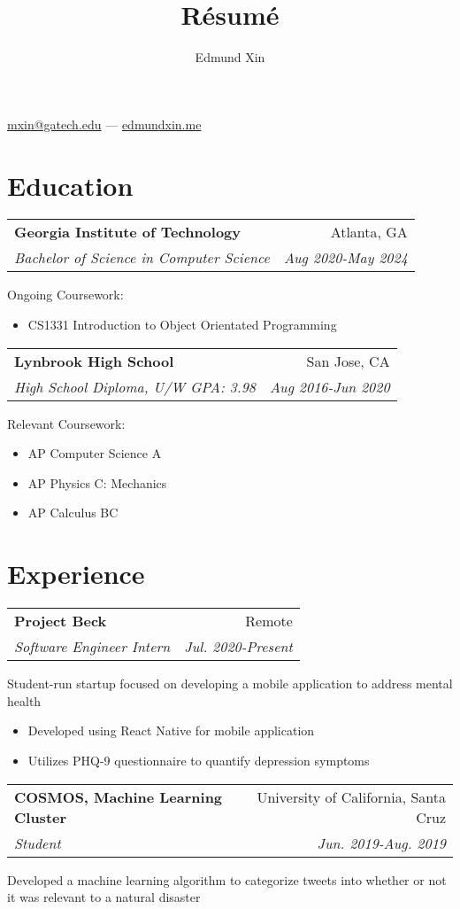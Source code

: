 \documentclass[letterpaper,8pt]{article}
\makeatletter
\renewcommand{\maketitle}{
  \begin{center}
  {\huge\bfseries
  \theauthor}

  \vspace{0.25em}

  \href{mailto:mxin@gatech.edu}{mxin@gatech.edu} --- \href{https://edmundxin.me}{edmundxin.me}

  \end{center}
}
\newcommand{\resumeSubheading}[4]{
  \vspace{0.25em}
  \begin{tabular*}{0.97\textwidth}[t]{l@{\extracolsep{\fill}}r}
    \textbf{#1} & #2 \\
    \textit{#3} & \textit{#4} \\
  \end{tabular*}\vspace{0.25em}
}
\makeatother
\begin{document}
\title{R\'esum\'e}
\author{Edmund Xin}

\maketitle

\section{Education}

\resumeSubheading{Georgia Institute of Technology}
{Atlanta, GA}{Bachelor of Science in Computer Science
}{Aug 2020-May 2024}
Ongoing Coursework:
\begin{itemize}[label=\raisebox{0.25ex}{\tiny$\bullet$}, font=\small]
  \item CS1331 Introduction to Object Orientated Programming
\end{itemize}


\resumeSubheading{Lynbrook High School}
{San Jose, CA}{High School Diploma, U/W GPA: 3.98}{Aug 2016-Jun 2020}
Relevant Coursework:
\begin{itemize}[label=\raisebox{0.25ex}{\tiny$\bullet$}]
  \item AP Computer Science A
  \item AP Physics C: Mechanics
  \item AP Calculus BC
\end{itemize}


\section{Experience}

\resumeSubheading{Project Beck}{Remote}{Software Engineer Intern}{Jul. 2020-Present}

Student-run startup focused on developing a mobile application to address mental health

\begin{itemize}[label=\raisebox{0.25ex}{\tiny$\bullet$}]
  \item Developed using React Native for mobile application
  \item Utilizes PHQ-9 questionnaire to quantify depression symptoms
\end{itemize}

\resumeSubheading{COSMOS, Machine Learning Cluster}
{University of California, Santa Cruz}{Student}{Jun. 2019-Aug. 2019}

Developed a machine learning algorithm to categorize tweets into whether or not it was relevant to a natural disaster
\end{document}

